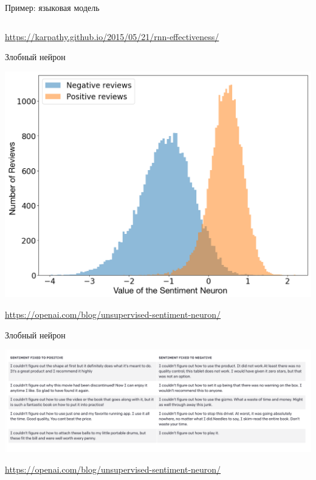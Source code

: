 \documentclass[notes,12pt, aspectratio=169]{beamer}
\begin{document}
\begin{frame}{Пример: языковая модель}
\begin{columns}
\begin{column}{.7\linewidth}
\begin{center}
		\end{center}
	\end{column}	
\end{columns}
\vfill 
\footnotesize 
\color{blue} \url{https://karpathy.github.io/2015/05/21/rnn-effectiveness/} 
\end{frame}


\begin{frame}{Злобный нейрон}
\begin{center}
	\includegraphics[width=.6\linewidth]{sent_neuron.png}
\end{center}
\vfill 
\footnotesize 
\color{blue} \url{https://openai.com/blog/unsupervised-sentiment-neuron/} 
\end{frame}


\begin{frame}{Злобный нейрон}
\begin{center}
	\includegraphics[width=.99\linewidth]{sent-text.png}
\end{center}
\vfill 
\footnotesize 
\color{blue} \url{https://openai.com/blog/unsupervised-sentiment-neuron/} 
\end{frame}
\end{document}
